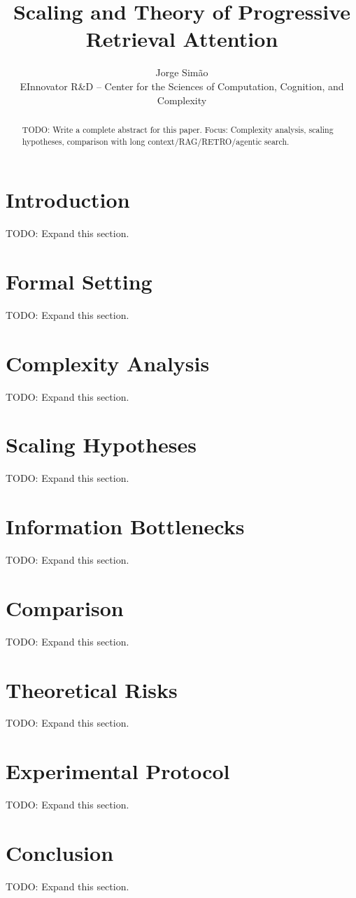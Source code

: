 \documentclass{article}
\title{Scaling and Theory of Progressive Retrieval Attention}
\author{Jorge Simão\\EInnovator R\&D -- Center for the Sciences of Computation, Cognition, and Complexity}
\begin{document}
\maketitle
\begin{abstract}
TODO: Write a complete abstract for this paper. Focus: Complexity analysis, scaling hypotheses, comparison with long context/RAG/RETRO/agentic search.
\end{abstract}
\section{Introduction}
TODO: Expand this section.

\section{Formal Setting}
TODO: Expand this section.

\section{Complexity Analysis}
TODO: Expand this section.

\section{Scaling Hypotheses}
TODO: Expand this section.

\section{Information Bottlenecks}
TODO: Expand this section.

\section{Comparison}
TODO: Expand this section.

\section{Theoretical Risks}
TODO: Expand this section.

\section{Experimental Protocol}
TODO: Expand this section.

\section{Conclusion}
TODO: Expand this section.



\end{document}

